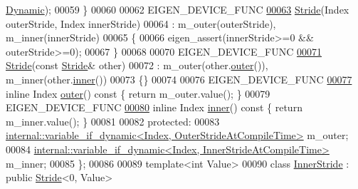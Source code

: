 \begin{DoxyCode}
      \hyperlink{namespace_eigen_ad81fa7195215a0ce30017dfac309f0b2}{Dynamic});
00059     \}
00060 
00062     EIGEN\_DEVICE\_FUNC
\hyperlink{group___core___module_ab769b5a97db488b06bf305f4ab970189}{00063}     \hyperlink{group___core___module_ab769b5a97db488b06bf305f4ab970189}{Stride}(Index outerStride, Index innerStride)
00064       : m\_outer(outerStride), m\_inner(innerStride)
00065     \{
00066       eigen\_assert(innerStride>=0 && outerStride>=0);
00067     \}
00068 
00070     EIGEN\_DEVICE\_FUNC
\hyperlink{group___core___module_a052fed680cf28ea284714be591bfbf86}{00071}     \hyperlink{group___core___module_a052fed680cf28ea284714be591bfbf86}{Stride}(\textcolor{keyword}{const} \hyperlink{group___core___module_class_eigen_1_1_stride}{Stride}& other)
00072       : m\_outer(other.\hyperlink{group___core___module_a261eede5809599db183b49bc274f8a07}{outer}()), m\_inner(other.\hyperlink{group___core___module_a24579b0e941cebef474c666e6d936b3b}{inner}())
00073     \{\}
00074 
00076     EIGEN\_DEVICE\_FUNC
\hyperlink{group___core___module_a261eede5809599db183b49bc274f8a07}{00077}     \textcolor{keyword}{inline} Index \hyperlink{group___core___module_a261eede5809599db183b49bc274f8a07}{outer}()\textcolor{keyword}{ const }\{ \textcolor{keywordflow}{return} m\_outer.value(); \}
00079     EIGEN\_DEVICE\_FUNC
\hyperlink{group___core___module_a24579b0e941cebef474c666e6d936b3b}{00080}     \textcolor{keyword}{inline} Index \hyperlink{group___core___module_a24579b0e941cebef474c666e6d936b3b}{inner}()\textcolor{keyword}{ const }\{ \textcolor{keywordflow}{return} m\_inner.value(); \}
00081 
00082   \textcolor{keyword}{protected}:
00083     \hyperlink{class_eigen_1_1internal_1_1variable__if__dynamic}{internal::variable\_if\_dynamic<Index, OuterStrideAtCompileTime>}
       m\_outer;
00084     \hyperlink{class_eigen_1_1internal_1_1variable__if__dynamic}{internal::variable\_if\_dynamic<Index, InnerStrideAtCompileTime>}
       m\_inner;
00085 \};
00086 
00089 \textcolor{keyword}{template}<\textcolor{keywordtype}{int} Value>
00090 \textcolor{keyword}{class }\hyperlink{class_eigen_1_1_inner_stride}{InnerStride} : \textcolor{keyword}{public} \hyperlink{group___core___module_class_eigen_1_1_stride}{Stride}<0, Value>

\end{DoxyCode}
